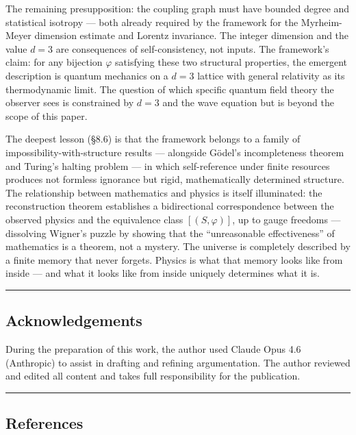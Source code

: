 \documentclass[
  11pt,
]{article}
\begin{document}
The remaining presupposition: the coupling graph must have bounded
degree and statistical isotropy --- both already required by the
framework for the Myrheim-Meyer dimension estimate and Lorentz
invariance. The integer dimension and the value \(d = 3\) are
consequences of self-consistency, not inputs. The framework's claim: for
any bijection \(\varphi\) satisfying these two structural properties,
the emergent description is quantum mechanics on a \(d = 3\) lattice
with general relativity as its thermodynamic limit. The question of
which specific quantum field theory the observer sees is constrained by
\(d = 3\) and the wave equation but is beyond the scope of this paper.

The deepest lesson (§8.6) is that the framework belongs to a family of
impossibility-with-structure results --- alongside Gödel's
incompleteness theorem and Turing's halting problem --- in which
self-reference under finite resources produces not formless ignorance
but rigid, mathematically determined structure. The relationship between
mathematics and physics is itself illuminated: the reconstruction
theorem establishes a bidirectional correspondence between the observed
physics and the equivalence class \([(S, \varphi)]\), up to gauge
freedoms --- dissolving Wigner's puzzle by showing that the
``unreasonable effectiveness'' of mathematics is a theorem, not a
mystery. The universe is completely described by a finite memory that
never forgets. Physics is what that memory looks like from inside ---
and what it looks like from inside uniquely determines what it is.

\begin{center}\rule{0.5\linewidth}{0.5pt}\end{center}

\hypertarget{acknowledgements}{%
\subsection{Acknowledgements}\label{acknowledgements}}

During the preparation of this work, the author used Claude Opus 4.6
(Anthropic) to assist in drafting and refining argumentation. The author
reviewed and edited all content and takes full responsibility for the
publication.

\begin{center}\rule{0.5\linewidth}{0.5pt}\end{center}

\hypertarget{references}{%
\subsection{References}\label{references}}
\end{document}
